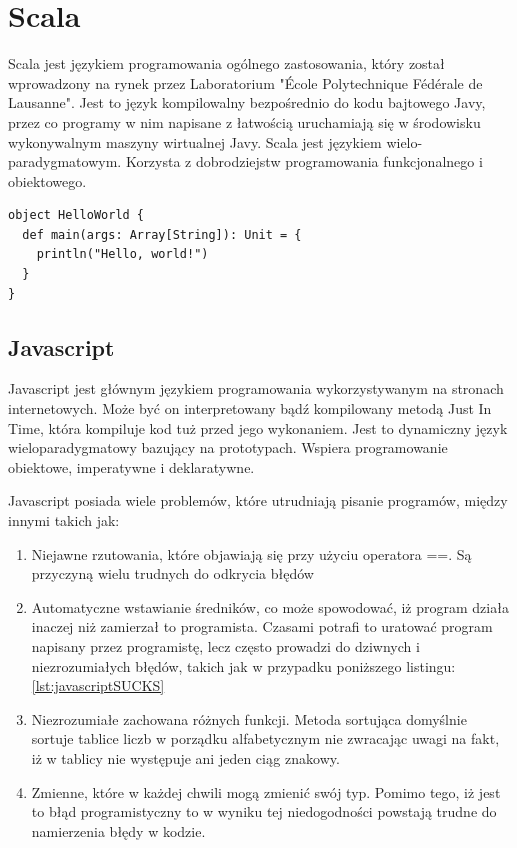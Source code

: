 \newpage
{\let\cleardoublepage\relax \chapter{Scala}}

Scala\cite{ScalaWiki} jest językiem programowania ogólnego zastosowania, który został wprowadzony na rynek przez Laboratorium "École Polytechnique Fédérale de Lausanne". Jest to język kompilowalny bezpośrednio do kodu bajtowego Javy, przez co programy w nim napisane z łatwością uruchamiają się w środowisku wykonywalnym maszyny wirtualnej Javy. 
Scala jest językiem wielo-paradygmatowym\cite{ScalaTour}. Korzysta z dobrodziejstw programowania funkcjonalnego i obiektowego.

\begin{lstlisting}[frame=single, numbers=none,captionpos=b, 
caption={Hello world napisany w języku Scala.}]
object HelloWorld {
  def main(args: Array[String]): Unit = {
    println("Hello, world!")
  }
}
\end{lstlisting}

\section{Javascript}

Javascript jest głównym językiem programowania wykorzystywanym na stronach internetowych. Może być on interpretowany bądź kompilowany metodą Just In Time, która kompiluje kod tuż przed jego wykonaniem. Jest to dynamiczny język wieloparadygmatowy bazujący na prototypach. Wspiera programowanie obiektowe, imperatywne i deklaratywne.\cite{AboutJS}

Javascript posiada wiele problemów, które utrudniają pisanie programów, między innymi takich jak:
\begin{enumerate}
	\item Niejawne rzutowania, które objawiają się przy użyciu operatora ==. Są przyczyną wielu trudnych do odkrycia błędów
	\item Automatyczne wstawianie średników, co może spowodować, iż program działa inaczej niż zamierzał to programista. Czasami potrafi to uratować program napisany przez programistę, lecz często prowadzi do dziwnych i niezrozumiałych błędów, takich jak w przypadku poniższego listingu: \ref{lst:javascriptSUCKS}
	\item Niezrozumiałe zachowana różnych funkcji. Metoda sortująca domyślnie sortuje tablice liczb w porządku alfabetycznym nie zwracając uwagi na fakt, iż w tablicy nie występuje ani jeden ciąg znakowy.
	\item Zmienne, które w każdej chwili mogą zmienić swój typ. Pomimo tego, iż jest to błąd programistyczny to w wyniku tej niedogodności powstają trudne do namierzenia błędy w kodzie.
\end{enumerate}

